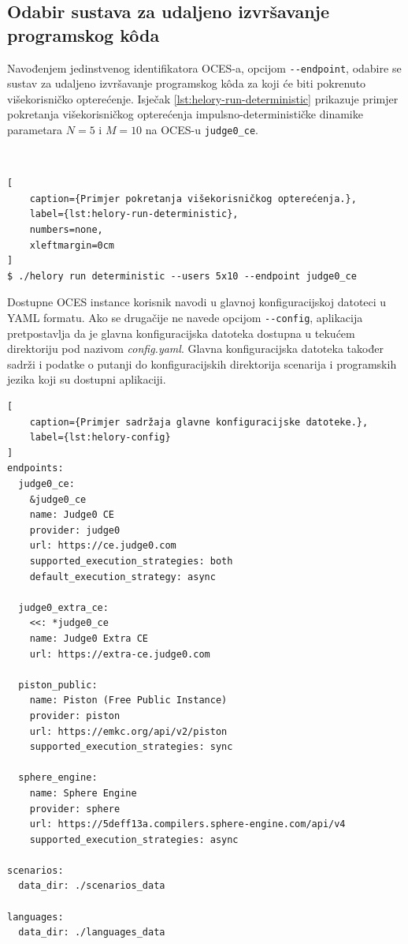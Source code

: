\documentclass[times, utf8, diplomski]{fer}
\begin{document}
\subsection{Odabir sustava za udaljeno izvršavanje programskog kôda}
Navođenjem jedinstvenog identifikatora OCES-a, opcijom \lstinline{--endpoint}, odabire se sustav za udaljeno izvršavanje programskog kôda za koji će biti pokrenuto višekorisničko opterećenje. Isječak \ref{lst:helory-run-deterministic} prikazuje primjer pokretanja višekorisničkog opterećenja impulsno-determinističke dinamike parametara $N=5$ i $M=10$ na OCES-u \lstinline{judge0_ce}.

\

\begin{lstlisting}[
    caption={Primjer pokretanja višekorisničkog opterećenja.},
    label={lst:helory-run-deterministic},
    numbers=none,
    xleftmargin=0cm
]
$ ./helory run deterministic --users 5x10 --endpoint judge0_ce
\end{lstlisting}

Dostupne OCES instance korisnik navodi u glavnoj konfiguracijskoj datoteci u YAML formatu. Ako se drugačije ne navede opcijom \lstinline{--config}, aplikacija pretpostavlja da je glavna konfiguracijska datoteka dostupna u tekućem direktoriju pod nazivom \textit{config.yaml}. Glavna konfiguracijska datoteka također sadrži i podatke o putanji do konfiguracijskih direktorija scenarija i programskih jezika koji su dostupni aplikaciji.

\pagebreak

\begin{lstlisting}[
    caption={Primjer sadržaja glavne konfiguracijske datoteke.},
    label={lst:helory-config}
]
endpoints:
  judge0_ce:
    &judge0_ce
    name: Judge0 CE
    provider: judge0
    url: https://ce.judge0.com
    supported_execution_strategies: both
    default_execution_strategy: async

  judge0_extra_ce:
    <<: *judge0_ce
    name: Judge0 Extra CE
    url: https://extra-ce.judge0.com

  piston_public:
    name: Piston (Free Public Instance)
    provider: piston
    url: https://emkc.org/api/v2/piston
    supported_execution_strategies: sync

  sphere_engine:
    name: Sphere Engine
    provider: sphere
    url: https://5deff13a.compilers.sphere-engine.com/api/v4
    supported_execution_strategies: async

scenarios:
  data_dir: ./scenarios_data

languages:
  data_dir: ./languages_data
\end{lstlisting}
\end{document}
